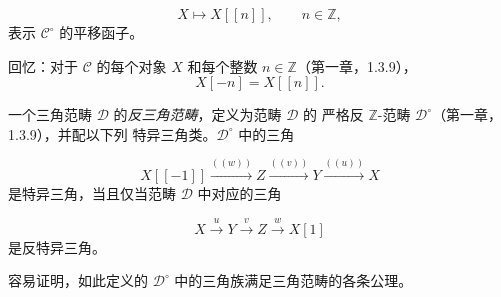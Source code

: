 \[
  X\longmapsto X[[n]],\qquad n\in\mathbb Z,
\]
表示 $\mathcal C^\circ$ 的平移函子。

回忆：对于 $\mathcal C$ 的每个对象 $X$ 和每个整数
$n\in\mathbb Z$（第一章，1.3.9），
\[
  X[-n]=X[[n]].
\]

一个三角范畴 $\mathcal D$ 的\emph{反三角范畴}，定义为范畴 $\mathcal D$ 的
严格反 $\mathbb Z$-范畴 $\mathcal D^\circ$（第一章，1.3.9），并配以下列
特异三角类。$\mathcal D^\circ$ 中的三角

\[
  X[[-1]]\xrightarrow{((w))}Z\xrightarrow{((v))}Y
  \xrightarrow{((u))}X
\]
是特异三角，当且仅当范畴 $\mathcal D$ 中对应的三角

\[
  X\xrightarrow{u}Y\xrightarrow{v}Z\xrightarrow{w}X[1]
\]
是反特异三角。

容易证明，如此定义的 $\mathcal D^\circ$ 中的三角族满足三角范畴的各条公理。
\endgroup
